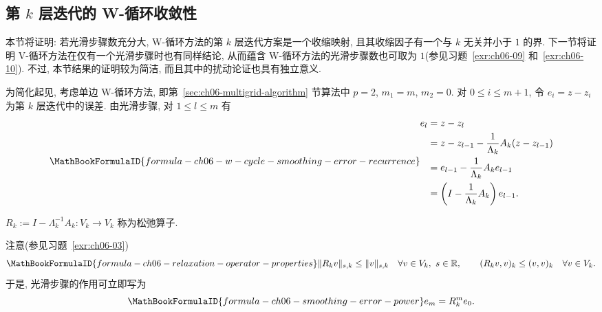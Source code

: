 \subsection{第 $k$ 层迭代的 W-循环收敛性}
\label{sec:ch06-w-cycle-convergence}
\setcounter{thmcount}{0}
\setcounter{equation}{0}

本节将证明: 若光滑步骤数充分大, W-循环方法的第 $k$ 层迭代方案是一个收缩映射, 且其收缩因子有一个与 $k$ 无关并小于 $1$ 的界. 下一节将证明 V-循环方法在仅有一个光滑步骤时也有同样结论, 从而蕴含 W-循环方法的光滑步骤数也可取为 $1$(参见习题~\ref{exr:ch06-09} 和~\ref{exr:ch06-10}). 不过, 本节结果的证明较为简洁, 而且其中的扰动论证也具有独立意义.

为简化起见, 考虑单边 W-循环方法, 即第~\ref{sec:ch06-multigrid-algorithm} 节算法中 $p=2$, $m_1=m$, $m_2=0$. 对 $0\leq i\leq m+1$, 令 $e_i=z-z_i$ 为第 $k$ 层迭代中的误差. 由光滑步骤, 对 $1\leq l\leq m$ 有
\begin{equation}
\MathBookFormulaID{formula-ch06-w-cycle-smoothing-error-recurrence}
\label{eq:ch06-w-cycle-smoothing-error-recurrence}
\begin{aligned}
e_l
&=z-z_l\\
&=z-z_{l-1}-\frac1{\Lambda_k}A_k(z-z_{l-1})\\
&=e_{l-1}-\frac1{\Lambda_k}A_ke_{l-1}\\
&=\left(I-\frac1{\Lambda_k}A_k\right)e_{l-1}.
\end{aligned}
\end{equation}

\begin{Definition}
\label{def:ch06-relaxation-operator}
$R_k:=I-\Lambda_k^{-1}A_k:V_k\longrightarrow V_k$ 称为松弛算子.
\end{Definition}

注意(参见习题~\ref{exr:ch06-03})
\begin{equation}
\MathBookFormulaID{formula-ch06-relaxation-operator-properties}
\label{eq:ch06-relaxation-operator-properties}
\|R_kv\|_{s,k}\leq\|v\|_{s,k}
\quad\forall v\in V_k,\ s\in\mathbb R,
\qquad
(R_kv,v)_k\leq(v,v)_k
\quad\forall v\in V_k.
\end{equation}
于是, 光滑步骤的作用可立即写为
\begin{equation}
\MathBookFormulaID{formula-ch06-smoothing-error-power}
\label{eq:ch06-smoothing-error-power}
e_m=R_k^me_0.
\end{equation}

